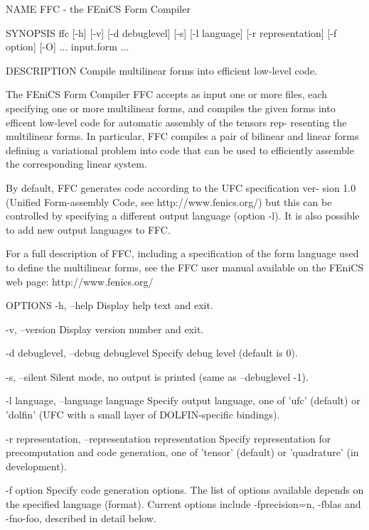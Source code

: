 NAME
       FFC - the FEniCS Form Compiler


SYNOPSIS
       ffc  [-h]  [-v]  [-d debuglevel] [-s] [-l language] [-r representation]
       [-f option] [-O] ... input.form ...


DESCRIPTION
       Compile multilinear forms into efficient low-level code.

       The FEniCS Form Compiler FFC accepts as input one or more  files,  each
       specifying  one or more multilinear forms, and compiles the given forms
       into efficent low-level code for automatic assembly of the tensors rep-
       resenting  the multilinear forms. In particular, FFC compiles a pair of
       bilinear and linear forms defining a variational problem into code that
       can be used to efficiently assemble the corresponding linear system.

       By  default, FFC generates code according to the UFC specification ver-
       sion 1.0 (Unified Form-assembly Code, see  http://www.fenics.org/)  but
       this  can  be  controlled  by  specifying  a  different output language
       (option -l). It is also possible to add new output languages to FFC.

       For a full description of FFC, including a specification  of  the  form
       language  used to define the multilinear forms, see the FFC user manual
       available on the FEniCS web page: http://www.fenics.org/


OPTIONS
       -h, --help
              Display help text and exit.

       -v, --version
              Display version number and exit.

       -d debuglevel, --debug debuglevel
              Specify debug level (default is 0).

       -s, --silent
              Silent mode, no output is printed (same as --debuglevel -1).

       -l language, --language language
              Specify output language, one of 'ufc' (default) or 'dolfin' (UFC
              with a small layer of DOLFIN-specific bindings).

       -r representation, --representation representation
              Specify  representation  for precomputation and code generation,
              one of 'tensor' (default) or 'quadrature' (in development).

       -f option
              Specify code generation options. The list of  options  available
              depends  on  the  specified  language  (format). Current options
              include -fprecision=n, -fblas and -fno-foo, described in  detail
              below.

